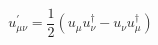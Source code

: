 \begin{equation}
u^{'}_{\mu\nu} = \frac{1}{2} (u_{\mu} u_{\nu}^{\dagger} - u_{\nu} u_{\mu}^{\dagger})
\end{equation}

